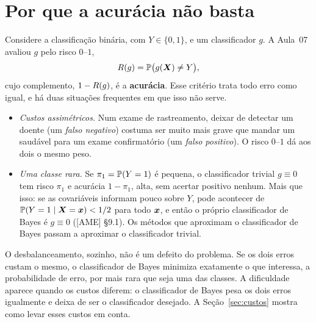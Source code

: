 \documentclass[11pt,a4paper]{article}
\begin{document}
\section{Por que a acurácia não basta}
Considere a classificação binária, com $Y\in\{0,1\}$, e um classificador $g$. A
Aula~07 avaliou $g$ pelo risco $0$--$1$,
\[
  R(g)=\mathbb{P}\big(g(\bm{X})\neq Y\big),
\]
cujo complemento, $1-R(g)$, é a \textbf{acurácia}. Esse critério trata todo erro
como igual, e há duas situações frequentes em que isso não serve.
\begin{itemize}[leftmargin=1.4cm]
  \item \emph{Custos assimétricos.} Num exame de rastreamento, deixar de detectar um
        doente (um \emph{falso negativo}) costuma ser muito mais grave que mandar um
        saudável para um exame confirmatório (um \emph{falso positivo}). O risco
        $0$--$1$ dá aos dois o mesmo peso.
  \item \emph{Uma classe rara.} Se $\pi_1=\mathbb{P}(Y=1)$ é pequena, o classificador
        trivial $g\equiv0$ tem risco $\pi_1$ e acurácia $1-\pi_1$, alta, sem acertar
        positivo nenhum. Mais que isso: se as covariáveis informam pouco sobre $Y$,
        pode acontecer de $\mathbb{P}(Y=1\mid\bm{X}=\bm{x})<1/2$ para todo $\bm{x}$, e então o próprio
        classificador de Bayes é $g\equiv0$ ([AME] §9.1). Os métodos que aproximam o
        classificador de Bayes passam a aproximar o classificador trivial.
\end{itemize}

\begin{atencao}
O desbalanceamento, sozinho, não é um defeito do problema. Se os dois erros custam o
mesmo, o classificador de Bayes minimiza exatamente o que interessa, a probabilidade
de erro, por mais rara que seja uma das classes. A dificuldade aparece quando os
custos diferem: o classificador de Bayes pesa os dois erros igualmente e deixa de
ser o classificador desejado. A Seção~\ref{sec:custos} mostra como levar esses
custos em conta.
\end{atencao}

\end{document}
